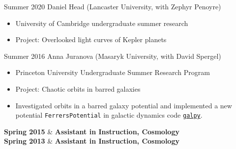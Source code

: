 %
%
%

\begin{studentprojects}
  \studentproject
    {Summer 2020}   {Daniel Head (Lancaster University, with Zephyr Penoyre)}
    {} {
        \begin{itemize}
          \item University of Cambridge undergraduate summer research
          \item Project: Overlooked light curves of Kepler planets          
        \end{itemize}
        }
  \emptySeparator
  \studentproject
    {Summer 2016}   {Anna Juranova (Masaryk University, with David Spergel)}
    {} {
        \begin{itemize}
          \item Princeton University Undergraduate Summer Research Program
          \item Project: Chaotic orbits in barred galaxies
          \item Investigated orbits in a barred galaxy potential and implemented a new
          potential {\tt FerrersPotential} in galactic dynamics code \href{http://galpy.readthedocs.io/en/latest/}{\tt galpy}.
        \end{itemize}
        }
  \emptySeparator
  \textbf{Spring 2015} & \textbf{Assistant in Instruction, Cosmology} \\
  \emptySeparator
  \textbf{Spring 2013} & \textbf{Assistant in Instruction, Cosmology}
\end{studentprojects}
